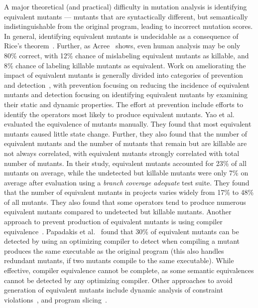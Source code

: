 \documentclass[conference]{IEEEtran}
\begin{document}
A major theoretical (and practical) difficulty in mutation analysis is identifying
equivalent mutants --- mutants that are syntactically different, but
semantically indistinguishable from the original program, leading to incorrect
mutation scores.  In general, identifying equivalent mutants is
undecidable as a consequence of Rice's theorem~\cite{rice1953classes}. Further,
as Acree~\cite{acree1980mutation} shows, even human analysis may be only 80\%
correct, with 12\% chance of mislabeling equivalent mutants as killable, and 8\%
chance of labeling killable mutants as equivalent.
Work on ameliorating the impact of equivalent mutants is
generally divided into categories of prevention and detection~\cite{papadakis2015trivial}, with
prevention focusing on reducing the incidence of equivalent mutants
and detection focusing on identifying equivalent mutants by
examining their static and dynamic properties.
The effort at prevention include efforts to identify the operators most likely
to produce equivalent mutants. Yao et al.~\cite{yao2014astudy} evaluated the
equivalence of mutants manually. They found that most equivalent mutants caused
little state change. Further, they also found that the number of equivalent
mutants and the number of mutants that remain but are killable are not always
correlated, with equivalent mutants strongly correlated with total number of
mutants. In their study, equivalent mutants accounted for 23\% of all mutants
on average, while the undetected but killable mutants were only 7\% on average
after evaluation using a \emph{branch coverage adequate} test suite. They
found that the number of equivalent mutants in projects varies widely from 17\%
to 48\% of all mutants. They also found that some operators tend to produce
numerous equivalent mutants compared to undetected but killable mutants.
Another approach to prevent production of equivalent mutants is using compiler
equivalence~\cite{baldwin1979heuristics,offutt1994using,papadakis2015trivial}.
Papadakis et al.~\cite{papadakis2015trivial} found that  30\% of equivalent
mutants can be detected by using an optimizing compiler to detect when
compiling a mutant produces the same executable as the original
program (this also handles redundant mutants, if two mutants compile
to the same executable).  While effective, compiler equivalence cannot
be complete, as some semantic equivalences cannot be detected by any
optimizing compiler.
Other approaches to avoid generation of equivalent mutants include
dynamic analysis of constraint violations~\cite{offutt1997automatically,nica2012using},
and program slicing~\cite{voas1997software,hierons1999using}.
\end{document}
